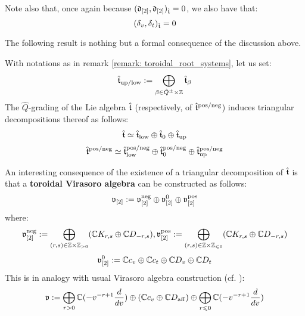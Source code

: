 \begin{remark}
\begin{enumerate}
                Note also that, once again because $(\mathfrak{d}_{[2]}, \mathfrak{d}_{[2]})_{\hat{\mathfrak{t}}} = 0$, we also have that:
                    $$(\delta_v, \delta_t)_{\hat{\mathfrak{t}}} = 0$$
            \end{enumerate}
        \end{remark}
        
        The following result is nothing but a formal consequence of the discussion above.
        \begin{proposition} \label{prop: triangular_decomposition_of_extended_toroidal_lie_algebras}
            With notations as in remark \ref{remark: toroidal_root_systems}, let us set:
                $$\extendedtoroidal_{\up/\low} := \bigoplus_{\beta \in \hat{Q}^{\pm} \x \Z} \extendedtoroidal_{\beta}$$
            The $\hat{Q}$-grading of the Lie algebra $\hat{\mathfrak{t}}$ (respectively, of $\hat{\mathfrak{t}}^{\mathrm{pos}/\mathrm{neg}}$) induces triangular decompositions thereof as follows:
                $$\hat{\mathfrak{t}} \simeq \hat{\mathfrak{t}}_{\mathrm{low}} \oplus \hat{\mathfrak{t}}_0 \oplus \hat{\mathfrak{t}}_{\mathrm{up}}$$
                $$\hat{\mathfrak{t}}^{\mathrm{pos}/\mathrm{neg}} \simeq \hat{\mathfrak{t}}^{\mathrm{pos}/\mathrm{neg}}_{\mathrm{low}} \oplus \hat{\mathfrak{t}}^{\mathrm{pos}/\mathrm{neg}}_0 \oplus \hat{\mathfrak{t}}^{\mathrm{pos}/\mathrm{neg}}_{\mathrm{up}}$$
        \end{proposition}
        \begin{remark} \label{remark: toroidal_virasoro_algebras}
            An interesting consequence of the existence of a triangular decomposition of $\hat{\mathfrak{t}}$ is that a \textbf{toroidal Virasoro algebra} can be constructed as follows:
                $$\mathfrak{v}_{[2]} := \mathfrak{v}_{[2]}^{\mathrm{neg}} \oplus \mathfrak{v}_{[2]}^0 \oplus \mathfrak{v}_{[2]}^{\mathrm{pos}}$$
            where:
                $$\frakv_{[2]}^{\negative} := \bigoplus_{(r, s) \in \Z \x \Z_{> 0}} (\bbC K_{r, s} \oplus \bbC D_{-r, s}), \frakv_{[2]}^{\positive} := \bigoplus_{(r, s) \in \Z \x \Z_{\leq 0}} (\bbC K_{r, s} \oplus \bbC D_{-r, s})$$
                $$\mathfrak{v}_{[2]}^0 := \mathbb{C} c_v \oplus \mathbb{C} c_t \oplus \mathbb{C} D_v \oplus \mathbb{C} D_t$$
            This is in analogy with usual Virasoro algebra construction (cf. \cite[Section 7.3]{kac_infinite_dimensional_lie_algebras}):
                $$\mathfrak{v} := \bigoplus_{r > 0} \mathbb{C}(-v^{-r + 1} \frac{d}{dv}) \oplus ( \mathbb{C} c_v \oplus \mathbb{C} D_{\mathrm{aff}} ) \oplus \bigoplus_{r \leqslant 0} \mathbb{C}(-v^{-r + 1} \frac{d}{dv})$$

        \end{remark}